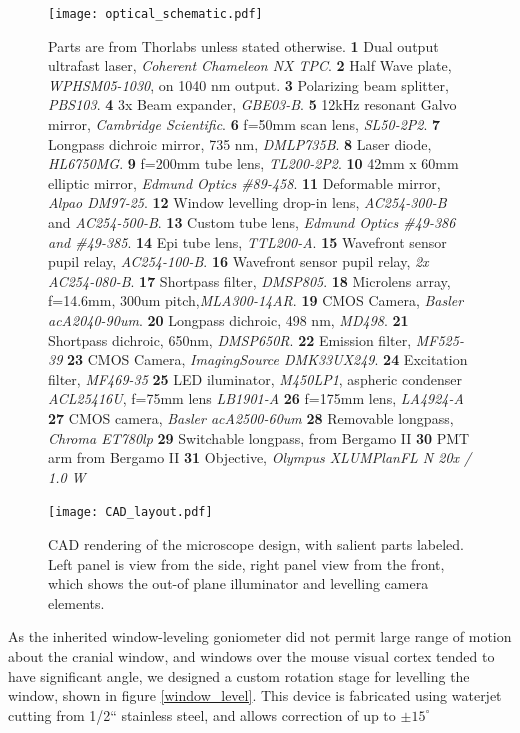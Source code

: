 \documentclass[a4paper,12pt]{article}
\begin{document}
\begin{figure}
\label{optical_schematic}
\centering
\texttt{[image: optical\_schematic.pdf]}
\caption{ Parts are from Thorlabs unless stated otherwise. 
\textbf{1} Dual output ultrafast laser, \textsl{Coherent Chameleon NX TPC}. 
\textbf{2} Half Wave plate, \textsl{WPHSM05-1030}, on 1040 nm output. 
\textbf{3} Polarizing beam splitter, \textsl{PBS103}.
\textbf{4} 3x Beam expander, \textsl{GBE03-B}.
\textbf{5} 12kHz resonant Galvo mirror, \textsl{Cambridge Scientific}.
\textbf{6} f=50mm scan lens, \textsl{SL50-2P2}.
\textbf{7} Longpass dichroic mirror, 735 nm, \textsl{DMLP735B}.
\textbf{8} Laser diode, \textsl{HL6750MG}.
\textbf{9} f=200mm tube lens, \textsl{TL200-2P2}.
\textbf{10} 42mm  x 60mm elliptic mirror, \textsl{Edmund Optics \#89-458}.
\textbf{11} Deformable mirror, \textsl{Alpao DM97-25}.
\textbf{12} Window levelling drop-in lens, \textsl{AC254-300-B} and \textsl{AC254-500-B}.
\textbf{13} Custom tube lens, \textsl{Edmund Optics \#49-386 and \#49-385}.
\textbf{14} Epi tube lens, \textsl{ TTL200-A}.
\textbf{15} Wavefront sensor pupil relay, \textsl{AC254-100-B}.
\textbf{16} Wavefront sensor pupil relay, \textsl{2x AC254-080-B}.
\textbf{17} Shortpass filter, \textsl{DMSP805}.
\textbf{18} Microlens array, f=14.6mm, 300um pitch,\textsl{MLA300-14AR}.
\textbf{19} CMOS Camera, \textsl{Basler acA2040-90um}.
\textbf{20} Longpass dichroic, 498 nm, \textsl{MD498}.
\textbf{21} Shortpass dichroic, 650nm, \textsl{DMSP650R}.
\textbf{22} Emission filter, \textsl{MF525-39}
\textbf{23} CMOS Camera, \textsl{ImagingSource DMK33UX249}.
\textbf{24} Excitation filter, \textsl{MF469-35}
\textbf{25} LED iluminator, \textsl{M450LP1}, aspheric condenser \textsl{ACL25416U}, f=75mm lens \textsl{LB1901-A}
\textbf{26} f=175mm lens, \textsl{LA4924-A}
\textbf{27} CMOS camera, \textsl{Basler acA2500-60um}
\textbf{28} Removable longpass, \textsl{Chroma ET780lp}
\textbf{29} Switchable longpass, from Bergamo II
\textbf{30} PMT arm from Bergamo II
\textbf{31} Objective, \textsl{Olympus XLUMPlanFL N 20x / 1.0 W} 
}
\end{figure}

\begin{figure}
\label{CAD_layout}
\centering
\texttt{[image: CAD\_layout.pdf]}
\caption{CAD rendering of the microscope design, with salient parts labeled.  Left panel is view from the side, right panel view from the front, which shows the out-of plane illuminator and levelling camera elements.  }
\end{figure}


As the inherited window-leveling goniometer did not permit large range of motion about the cranial window, and windows over the mouse visual cortex tended to have significant angle, we designed a custom rotation stage for levelling the window, shown in figure \ref{window_level}.  This device is fabricated using waterjet cutting from 1/2`` stainless steel, and allows correction of up to $\pm 15^{\circ}$
\end{document}
